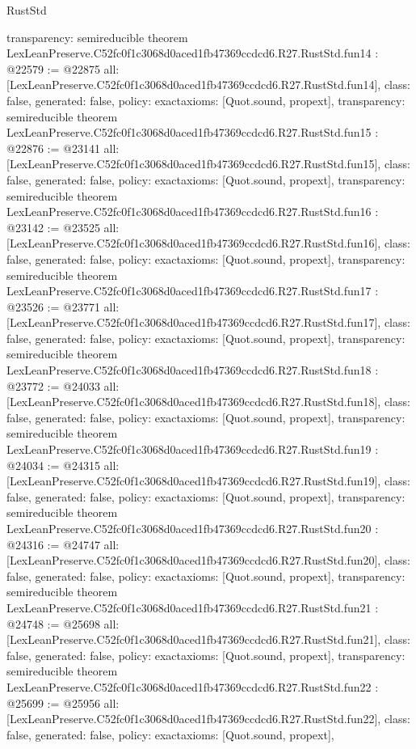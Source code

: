 \begin{lexlean}{RustStd}
\begin{coremodule}
{  transparency: semireducible
}
theorem LexLeanPreserve.C52fc0f1c3068d0aced1fb47369ccdcd6.R27.RustStd.fun14 : @22579 := @22875 {
  all: [LexLeanPreserve.C52fc0f1c3068d0aced1fb47369ccdcd6.R27.RustStd.fun14],
  class: false,
  generated: false,
  policy: exact{axioms: [Quot.sound, propext]},
  transparency: semireducible
}
theorem LexLeanPreserve.C52fc0f1c3068d0aced1fb47369ccdcd6.R27.RustStd.fun15 : @22876 := @23141 {
  all: [LexLeanPreserve.C52fc0f1c3068d0aced1fb47369ccdcd6.R27.RustStd.fun15],
  class: false,
  generated: false,
  policy: exact{axioms: [Quot.sound, propext]},
  transparency: semireducible
}
theorem LexLeanPreserve.C52fc0f1c3068d0aced1fb47369ccdcd6.R27.RustStd.fun16 : @23142 := @23525 {
  all: [LexLeanPreserve.C52fc0f1c3068d0aced1fb47369ccdcd6.R27.RustStd.fun16],
  class: false,
  generated: false,
  policy: exact{axioms: [Quot.sound, propext]},
  transparency: semireducible
}
theorem LexLeanPreserve.C52fc0f1c3068d0aced1fb47369ccdcd6.R27.RustStd.fun17 : @23526 := @23771 {
  all: [LexLeanPreserve.C52fc0f1c3068d0aced1fb47369ccdcd6.R27.RustStd.fun17],
  class: false,
  generated: false,
  policy: exact{axioms: [Quot.sound, propext]},
  transparency: semireducible
}
theorem LexLeanPreserve.C52fc0f1c3068d0aced1fb47369ccdcd6.R27.RustStd.fun18 : @23772 := @24033 {
  all: [LexLeanPreserve.C52fc0f1c3068d0aced1fb47369ccdcd6.R27.RustStd.fun18],
  class: false,
  generated: false,
  policy: exact{axioms: [Quot.sound, propext]},
  transparency: semireducible
}
theorem LexLeanPreserve.C52fc0f1c3068d0aced1fb47369ccdcd6.R27.RustStd.fun19 : @24034 := @24315 {
  all: [LexLeanPreserve.C52fc0f1c3068d0aced1fb47369ccdcd6.R27.RustStd.fun19],
  class: false,
  generated: false,
  policy: exact{axioms: [Quot.sound, propext]},
  transparency: semireducible
}
theorem LexLeanPreserve.C52fc0f1c3068d0aced1fb47369ccdcd6.R27.RustStd.fun20 : @24316 := @24747 {
  all: [LexLeanPreserve.C52fc0f1c3068d0aced1fb47369ccdcd6.R27.RustStd.fun20],
  class: false,
  generated: false,
  policy: exact{axioms: [Quot.sound, propext]},
  transparency: semireducible
}
theorem LexLeanPreserve.C52fc0f1c3068d0aced1fb47369ccdcd6.R27.RustStd.fun21 : @24748 := @25698 {
  all: [LexLeanPreserve.C52fc0f1c3068d0aced1fb47369ccdcd6.R27.RustStd.fun21],
  class: false,
  generated: false,
  policy: exact{axioms: [Quot.sound, propext]},
  transparency: semireducible
}
theorem LexLeanPreserve.C52fc0f1c3068d0aced1fb47369ccdcd6.R27.RustStd.fun22 : @25699 := @25956 {
  all: [LexLeanPreserve.C52fc0f1c3068d0aced1fb47369ccdcd6.R27.RustStd.fun22],
  class: false,
  generated: false,
  policy: exact{axioms: [Quot.sound, propext]},
}
\end{coremodule}
\end{lexlean}
